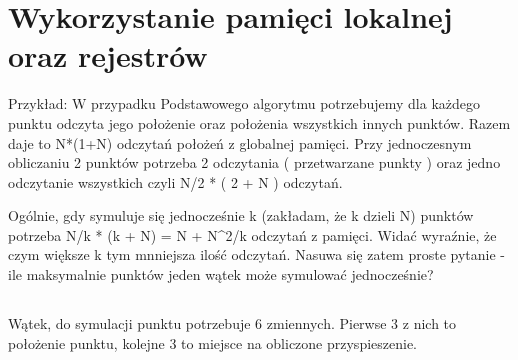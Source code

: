 
\section { Wykorzystanie pamięci lokalnej oraz rejestrów }




Przykład:
W przypadku Podstawowego algorytmu potrzebujemy dla każdego punktu odczyta jego położenie oraz położenia wszystkich innych punktów. Razem daje to N*(1+N) odczytań położeń z globalnej pamięci. Przy jednoczesnym obliczaniu 2 punktów potrzeba 2 odczytania ( przetwarzane punkty ) oraz jedno odczytanie wszystkich czyli N/2  * ( 2 + N ) odczytań.

Ogólnie, gdy symuluje się jednocześnie k (zakładam, że k dzieli N) punktów potrzeba N/k * (k + N) = N + N^2/k odczytań z pamięci. Widać wyraźnie, że czym większe k tym mnniejsza ilość odczytań. Nasuwa się zatem proste pytanie - ile maksymalnie punktów jeden wątek może symulować jednocześnie?

\subsection{}

Wątek, do symulacji punktu potrzebuje 6 zmiennych. Pierwse 3 z nich to położenie punktu, kolejne 3 to miejsce na obliczone przyspieszenie.